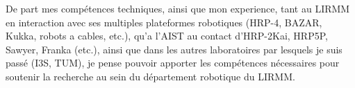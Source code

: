 \documentclass[11pt, a4paper]{awesome-cv}
\begin{document}
\begin{cvletter}
  De part mes compétences techniques, ainsi que mon experience, tant au LIRMM en interaction avec ses multiples plateformes robotiques (HRP-4, BAZAR, Kukka, robots a cables, etc.), qu'a l'AIST au contact d'HRP-2Kai, HRP5P, Sawyer, Franka (etc.), ainsi que dans les autres laboratoires par lesquels je suis passé (I3S, TUM), je pense pouvoir apporter les compétences nécessaires pour soutenir la recherche au sein du département robotique du LIRMM. 

\end{cvletter}


\makeletterclosing
\end{document}
